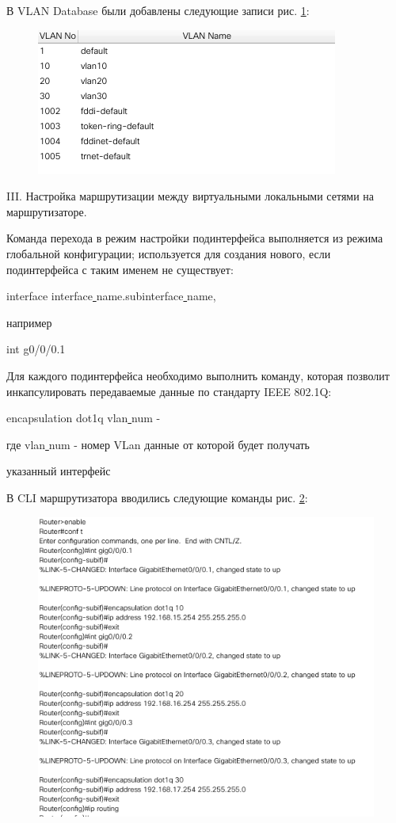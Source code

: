 \documentclass[a4paper,14pt]{extreport} %
\begin{document}
В VLAN Database были добавлены следующие записи рис. \ref{fig:21}:

\begin{figure}[H]
	\centering
	\includegraphics[width=0.7\linewidth]{2_1}
	\caption{}
	\label{fig:21}
\end{figure}

III. Настройка маршрутизации между виртуальными локальными сетями на маршрутизаторе.

Команда перехода в режим настройки подинтерфейса выполняется из режима глобальной конфигурации; используется для создания нового, если подинтерфейса с таким именем не существует:

interface interface\underline{ }name.subinterface\underline{ }name,

например

int g0/0/0.1

Для каждого подинтерфейса необходимо выполнить команду, которая позволит инкапсулировать передаваемые данные по стандарту IEEE 802.1Q:

encapsulation dot1q vlan\underline{ }num - 

где vlan\underline{ }num - номер VLan данные от которой будет получать

 указанный интерфейс

В CLI маршрутизатора вводились следующие команды рис. \ref{fig:3}:

\begin{figure}[H]
	\centering
	\includegraphics[width=1\linewidth]{3}
	\caption{}
	\label{fig:3}
\end{figure}
\end{document}
